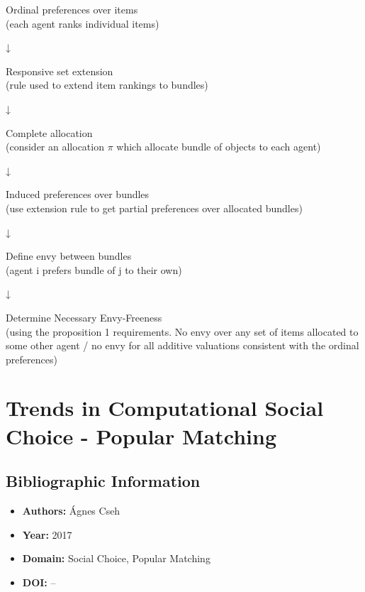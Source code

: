 \documentclass[12pt,a4paper]{article}
\begin{document}
\begin{center}
Ordinal preferences over items\\
(each agent ranks individual items)

        ↓

Responsive set extension\\
(rule used to extend item rankings to bundles)

        ↓

Complete allocation\\
(consider an allocation $\pi$ which allocate bundle of objects to each agent)

        ↓

Induced preferences over bundles\\
(use extension rule to get partial preferences over allocated bundles)
        
        ↓

Define envy between bundles\\
(agent i prefers bundle of j to their own)

        ↓

Determine Necessary Envy-Freeness\\
(using the proposition 1 requirements. No envy over any set of items allocated to some other agent / no envy for all additive valuations consistent with the ordinal preferences)
\end{center}


\newpage



\section{Trends in Computational Social Choice - Popular Matching}
\label{sec:article5}

\subsection*{Bibliographic Information}
\begin{itemize}
    \item \textbf{Authors:} Ágnes Cseh
    \item \textbf{Year:} 2017
    \item \textbf{Domain:} Social Choice, Popular Matching
    \item \textbf{DOI:} --
\end{itemize}
\end{document}
